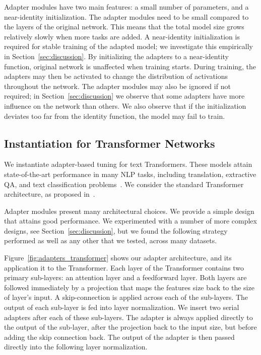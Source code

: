 \documentclass{article}
\begin{document}
Adapter modules have two main features: a small number of parameters, and a near-identity initialization.
The adapter modules need to be small compared to the layers of the original network.
This means that the total model size grows relatively slowly when more tasks are added.
A near-identity initialization is required for stable training of the adapted model;
we investigate this empirically in Section~\ref{sec:discussion}.
By initializing the adapters to a near-identity function, original network is unaffected when training starts.
During training, the adapters may then be activated to change the distribution of activations throughout the network.
The adapter modules may also be ignored if not required;
in Section~\ref{sec:discussion} we observe that some adapters have more influence on the network than others.
We also observe that if the initialization deviates too far from the identity function, the model may fail to train.

\subsection{Instantiation for Transformer Networks\label{sec:bottleneckadapter}}

We instantiate adapter-based tuning for text Transformers.
These models attain state-of-the-art performance in many NLP tasks,
including translation, extractive QA, and text classification problems~\citep{vaswani2017,radford2018improving,devlin2018bert}.
We consider the standard Transformer architecture, as proposed in~\citet{vaswani2017}.

Adapter modules present many architectural choices.
We provide a simple design that attains good performance.
We experimented with a number of more complex designs, see Section~\ref{sec:discussion},
but we found the following strategy performed as well as any other that we tested, across many datasets.

Figure~\ref{fig:adapters_transformer} shows our adapter architecture, and its application it to the Transformer.
Each layer of the Transformer contains two primary sub-layers: an attention layer and a feedforward layer.
Both layers are followed immediately by a projection that maps the features size back to the size of layer's input.
A skip-connection is applied across each of the sub-layers.
The output of each sub-layer is fed into layer normalization.
We insert two serial adapters after each of these sub-layers.
The adapter is always applied directly to the output of the sub-layer, after the projection back to the input size,
but before adding the skip connection back.
The output of the adapter is then passed directly into the following layer normalization.
\end{document}
